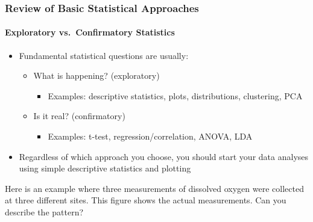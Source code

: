\documentclass[10pt]{beamer}
\newcommand{\blue}{\color{blue}}
\newcommand{\bi}{\begin{itemize}}
\newcommand{\ei}{\end{itemize}}
\newcommand{\iwsframe}[2]{
\begin{frame}[fragile]
\frametitle{#1}
\framesubtitle{#2}
}
\begin{document}
\iwsframe{Review of Basic Statistical Approaches}{Exploratory vs.~Confirmatory Statistics}

\bi
\item Fundamental statistical questions are usually:
	\bi
	\item What is happening? {\blue (exploratory)}
		\bi
		\item Examples: descriptive statistics, plots,
		distributions, clustering, PCA
		\ei
	\item Is it real? {\blue (confirmatory)}
		\bi
		\item Examples: t-test, regression/correlation, ANOVA, LDA
		\ei 
	\ei

\item Regardless of which approach you choose, you should start your
  data analyses using simple descriptive statistics and plotting

\ei

\end{frame}




\begin{frame}
\begin{center}
\end{center}

\vspace{-2ex}
{\scriptsize Here is an example where three measurements of dissolved
  oxygen were collected at three different sites.  This figure shows the
  actual measurements.  Can you describe the pattern?\\}
\end{frame}
\end{document}
